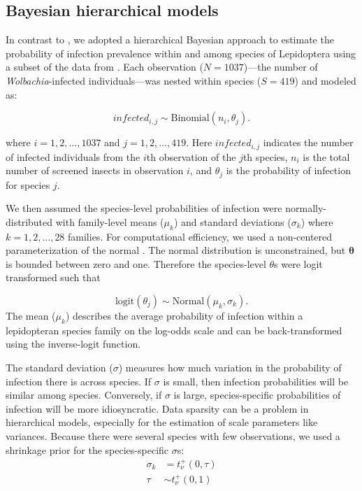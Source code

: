 \documentclass{frontiersSCNS} %
\begin{document}
\subsection{Bayesian hierarchical models}
	In contrast to \cite{Ahmed:2015aa}, we adopted a hierarchical Bayesian approach to estimate the probability of infection prevalence within and among species of Lepidoptera using a subset of the data from \cite{Weinert:2015aa}. Each observation ($N=1037$)---the number of \emph{Wolbachia}-infected individuals---was nested within species ($S=419$) and  modeled as:

\begin{equation}
	infected_{i,j} \sim \mathrm{Binomial}(n_{i}, \theta_{j}).
\end{equation}

where $i = 1, 2, \ldots, 1037$ and $j = 1, 2, \ldots, 419$. Here $infected_{i,j}$ indicates the number of infected individuals from the $i$th observation of the $j$th species,  $n_{i}$ is the total number of screened insects in observation $i$, and $\theta_{j}$ is the probability of infection for species $j$. 

	We then assumed the species-level probabilities of infection were normally-distributed with family-level means ($\mu_{k}$) and standard deviations ($\sigma_{k}$) where $k = 1, 2, \ldots, 28$ families. For computational efficiency, we used a non-centered parameterization of the normal \citep{Papaspiliopoulos:2007aa}. The normal distribution is unconstrained, but $\mathbf{\theta}$ is bounded between zero and one. Therefore the species-level $\theta$s were logit transformed such that  

	\begin{equation}    
		\mathrm{logit} (\theta_{j}) \sim \mathrm{Normal}(\mu_{k}, \sigma_{k}).
	\end{equation}
The mean ($\mu_{k}$) describes the average probability of infection within a lepidopteran species family on the log-odds scale and can be back-transformed using the inverse-logit function. 

The standard deviation ($\sigma$) measures how much variation in the probability of infection there is across species. If $\sigma$ is small, then infection probabilities will be similar among species. Conversely, if $\sigma$ is large, species-specific probabilities of infection will be more idiosyncratic. Data sparsity can be a problem in hierarchical models, especially for the estimation of scale parameters like variances. Because there were several species with few observations, we used a shrinkage prior \citep{Carvalho:2009aa,Carvalho:2010aa}
for the species-specific $\sigma$s: 
	\begin{align}
		\sigma_{k} 	&= 	 	t_{\nu}^{+}(0,\tau) \nonumber \\
        \tau		&\sim	t_{\nu}^{+}(0,1)     
	\end{align}
\end{document}

